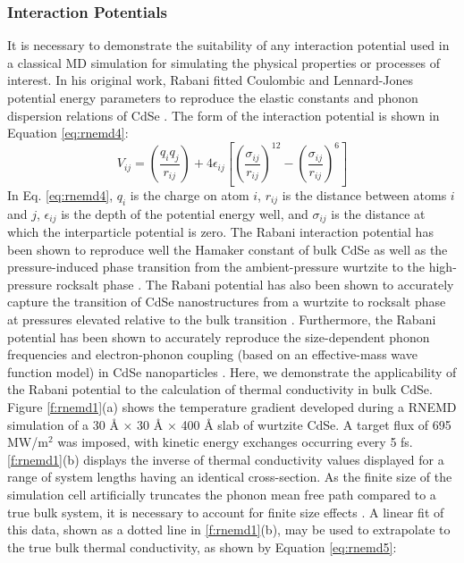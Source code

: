 \subsubsection{Interaction Potentials}
It is necessary to demonstrate the suitability of any interaction potential used in a classical MD simulation for simulating the physical properties or processes of interest. In his original work, Rabani fitted Coulombic and Lennard-Jones potential energy parameters to reproduce the elastic constants and phonon dispersion relations of CdSe \cite{:/content/aip/journal/jcp/116/1/10.1063/1.1424321}.  The form of the interaction potential is shown in Equation \ref{eq:rnemd4}:
\begin{equation} \label{eq:rnemd4}
V_{ij} = \left(\frac{q_iq_j}{r_{ij}}\right) + 4\epsilon_{ij}\left[\left(\frac{\sigma_{ij}}{r_{ij}}\right)^{12}- \left(\frac{\sigma_{ij}}{r_{ij}}\right)^6\right]
\end{equation}
In Eq. \ref{eq:rnemd4}, $q_i$ is the charge on atom $i$, $r_{ij}$ is the distance between atoms $i$ and $j$, $\epsilon_{ij}$ is the depth of the potential energy well, and $\sigma_{ij}$ is the distance at which the interparticle potential is zero.  The Rabani interaction potential has been shown to reproduce well the Hamaker constant of bulk CdSe as well as the pressure-induced phase transition from the ambient-pressure wurtzite to the high-pressure rocksalt phase \cite{:/content/aip/journal/jcp/116/1/10.1063/1.1424321}.  The Rabani potential has also been shown to accurately capture the transition of CdSe nanostructures from a wurtzite to rocksalt phase at pressures elevated relative to the bulk transition \cite{PhysRevLett.96.255701, doi:10.1021/nl3007165}.  Furthermore, the Rabani potential has been shown to accurately reproduce the size-dependent phonon frequencies and electron-phonon coupling (based on an effective-mass wave function model) in CdSe nanoparticles \cite{doi:10.1021/nn201475d}.  Here, we demonstrate the applicability of the Rabani potential to the calculation of thermal conductivity in bulk CdSe.  Figure \ref{f:rnemd1}(a) shows the temperature gradient developed during a RNEMD simulation of a 30 Å × 30 Å × 400 Å slab of wurtzite CdSe. A target flux of 695 MW/m$^2$ was imposed, with kinetic energy exchanges occurring every 5 fs.  \ref{f:rnemd1}(b) displays the inverse of thermal conductivity values displayed for a range of system lengths having an identical cross-section. As the finite size of the simulation cell artificially truncates the phonon mean free path compared to a true bulk system, it is necessary to account for finite size effects \cite{chantrenne2004finite}.  A linear fit of this data, shown as a dotted line in \ref{f:rnemd1}(b), may be used to extrapolate to the true bulk thermal conductivity, as shown by Equation \ref{eq:rnemd5}:
